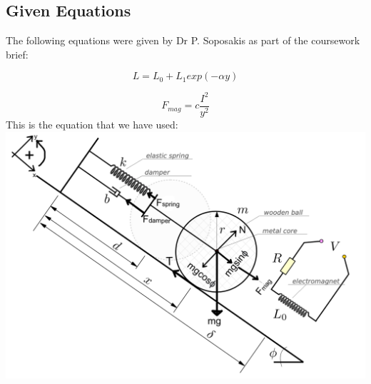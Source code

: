 \subsection*{Given Equations} The following equations were given by Dr P. Soposakis as part of the coursework brief:

\begin{equation} \label{eq:1}
    L = L_0 + L_1 exp(-\alpha y)
\end{equation}

\begin{equation} \label{eq:2}
    F_{mag}=c \frac{I^2}{y^2}
\end{equation}
This is the equation that we have used:\\
\includegraphics[scale=0.6]{Report/figures/main_diagram.png}